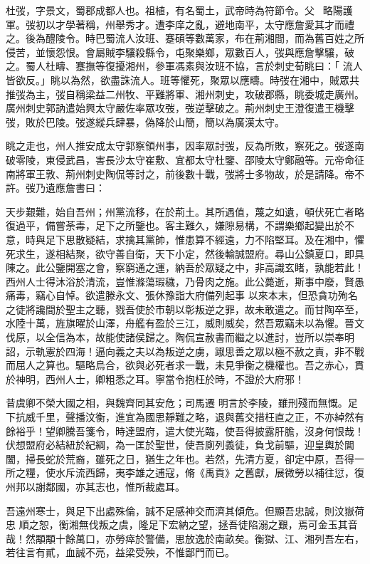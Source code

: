 \begin{pinyinscope}
 杜弢，字景文，蜀郡成都人也。祖植，有名蜀土，武帝時為符節令。父，略陽護軍。弢初以才學著稱，州舉秀才。遭李庠之亂，避地南平，太守應詹愛其才而禮之。後為醴陵令。時巴蜀流人汝班、蹇碩等數萬家，布在荊湘間，而為舊百姓之所侵苦，並懷怨恨。會屬賊李驤殺縣令，屯聚樂鄉，眾數百人，弢與應詹擊驤，破之。蜀人杜疇、蹇撫等復擾湘州，參軍馮素與汝班不協，言於刺史荀眺曰：「
 流人皆欲反。」眺以為然，欲盡誅流人。班等懼死，聚眾以應疇。時弢在湘中，賊眾共推弢為主，弢自稱梁益二州牧、平難將軍、湘州刺史，攻破郡縣，眺委城走廣州。廣州刺史郭訥遣始興太守嚴佐率眾攻弢，弢逆擊破之。荊州刺史王澄復遣王機擊弢，敗於巴陵。弢遂縱兵肆暴，偽降於山簡，簡以為廣漢太守。



 眺之走也，州人推安成太守郭察領州事，因率眾討弢，反為所敗，察死之。弢遂南破零陵，東侵武昌，害長沙太守崔敷、宜都太守杜鑒、邵陵太守鄭融等。元帝命征南將軍王敦、荊州刺史陶侃等討之，前後數十戰，弢將士多物故，於是請降。帝不
 許。弢乃遺應詹書曰：



 天步艱難，始自吾州；州黨流移，在於荊土。其所遇值，蔑之如遺，頓伏死亡者略復過平，備嘗荼毒，足下之所鑒也。客主難久，嫌隙易構，不謂樂鄉起變出於不意，時與足下思散疑結，求擒其黨帥，惟患算不經遠，力不陷堅耳。及在湘中，懼死求生，遂相結聚，欲守善自衛，天下小定，然後輸誠盟府。尋山公鎮夏口，即具陳之。此公鑒開塞之會，察窮通之運，納吾於眾疑之中，非高識玄睹，孰能若此！西州人士得沐浴於清流，豈惟滌蕩瑕穢，乃骨肉之施。此公薨逝，斯事中廢，賢愚痛毒，竊心自悼。欲遣滕永文、張休豫詣大府備列起事
 以來本末，但恐貪功殉名之徒將讒間於聖主之聽，戮吾使於市朝以彰叛逆之罪，故未敢遣之。而甘陶卒至，水陸十萬，旌旗曜於山澤，舟艦有盈於三江，威則威矣，然吾眾竊未以為懼。晉文伐原，以全信為本，故能使諸侯歸之。陶侃宣赦書而繼之以進討，豈所以崇奉明詔，示軌憲於四海！逼向義之夫以為叛逆之虜，踧思善之眾以極不赦之責，非不戰而屈人之算也。驅略烏合，欲與必死者求一戰，未見爭衡之機權也。吾之赤心，貫於神明，西州人士，卿粗悉之耳。寧當令抱枉於時，不證於大府邪！



 昔虞卿不榮大國之相，與魏齊同其安危；司馬遷
 明言於李陵，雖刑殘而無慨。足下抗威千里，聲播汶衡，進宜為國思靜難之略，退與舊交措枉直之正，不亦綽然有餘裕乎！望卿騰吾箋令，時達盟府，遣大使光臨，使吾得披露肝膽，沒身何恨哉！伏想盟府必結紐於紀綱，為一匡於聖世，使吾廁列義徒，負戈前驅，迎皇輿於閶闔，掃長蛇於荒裔，雖死之日，猶生之年也。若然，先清方夏，卻定中原，吾得一所之糧，使水斥流西歸，夷李雄之逋寇，脩《禹貢》之舊獻，展微勞以補往愆，復州邦以謝鄰國，亦其志也，惟所裁處耳。



 吾遠州寒士，與足下出處殊倫，誠不足感神交而濟其傾危。但顯吾忠誠，則汶嶽荷忠
 順之恕，衡湘無伐叛之虞，隆足下宏納之望，拯吾徒陷溺之艱，焉可金玉其音哉！然顒顒十餘萬口，亦勞瘁於警備，思放逸於南畝矣。衡獄、江、湘列吾左右，若往言有貳，血誠不亮，益梁受殃，不惟鄙門而已。




\end{pinyinscope}
